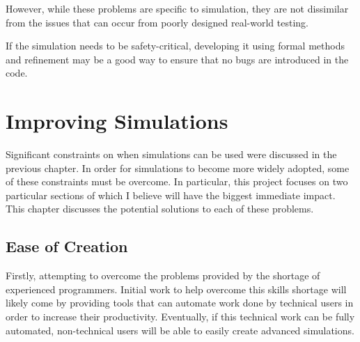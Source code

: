 \documentclass{UoYCSproject}
\begin{document}
However, while these problems are specific to simulation, they are not dissimilar from the issues that can occur from poorly designed real-world testing.

If the simulation needs to be safety-critical, developing it using formal methods and refinement may be a good way to ensure that no bugs are introduced in the code.

\section{Improving Simulations}
\label{improvements}
Significant constraints on when simulations can be used were discussed in the previous chapter.
In order for simulations to become more widely adopted, some of these constraints must be overcome. 
In particular, this project focuses on two particular sections of which I believe will have the biggest immediate impact.
This chapter discusses the potential solutions to each of these problems.


\subsection{Ease of Creation}
Firstly, attempting to overcome the problems provided by the shortage of experienced programmers.
Initial work to help overcome this skills shortage will likely come by providing tools that can automate work done by technical users in order to increase their productivity.
Eventually, if this technical work can be fully automated, non-technical users will be able to easily create advanced simulations.

\end{document}
